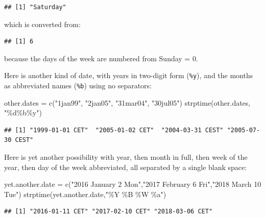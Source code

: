 \documentclass[
]{book}
\newenvironment{Shaded}{\begin{snugshade}}{\end{snugshade}}
\newcommand{\FunctionTok}[1]{\textcolor[rgb]{0.00,0.00,0.00}{#1}}
\newcommand{\NormalTok}[1]{#1}
\newcommand{\OtherTok}[1]{\textcolor[rgb]{0.56,0.35,0.01}{#1}}
\newcommand{\SpecialCharTok}[1]{\textcolor[rgb]{0.00,0.00,0.00}{#1}}
\newcommand{\StringTok}[1]{\textcolor[rgb]{0.31,0.60,0.02}{#1}}
\theoremstyle{definition}
\theoremstyle{definition}
\theoremstyle{definition}
\theoremstyle{definition}
\theoremstyle{remark}
\begin{document}
\begin{verbatim}
## [1] "Saturday"
\end{verbatim}

which is converted from:

\begin{Shaded}
\end{Shaded}

\begin{verbatim}
## [1] 6
\end{verbatim}

because the days of the week are numbered from Sunday = 0.

Here is another kind of date, with years in two-digit form (\texttt{\%y}), and the months as abbreviated names (\texttt{\%b}) using no separators:

\begin{Shaded}
\begin{Highlighting}[]
\NormalTok{other.dates }\OtherTok{=} \FunctionTok{c}\NormalTok{(}\StringTok{"1jan99"}\NormalTok{, }\StringTok{"2jan05"}\NormalTok{, }\StringTok{"31mar04"}\NormalTok{, }\StringTok{"30jul05"}\NormalTok{)}
\FunctionTok{strptime}\NormalTok{(other.dates, }\StringTok{"\%d\%b\%y"}\NormalTok{)}
\end{Highlighting}
\end{Shaded}

\begin{verbatim}
## [1] "1999-01-01 CET"  "2005-01-02 CET"  "2004-03-31 CEST" "2005-07-30 CEST"
\end{verbatim}

Here is yet another possibility with year, then month in full, then week of the year, then day of the week abbreviated, all separated by a single blank space:

\begin{Shaded}
\begin{Highlighting}[]
\NormalTok{yet.another.date }\OtherTok{=} \FunctionTok{c}\NormalTok{(}\StringTok{"2016 January 2 Mon"}\NormalTok{,}\StringTok{"2017 February 6 Fri"}\NormalTok{,}\StringTok{"2018 March 10 Tue"}\NormalTok{)}
\FunctionTok{strptime}\NormalTok{(yet.another.date,}\StringTok{"\%Y \%B \%W \%a"}\NormalTok{)}
\end{Highlighting}
\end{Shaded}

\begin{verbatim}
## [1] "2016-01-11 CET" "2017-02-10 CET" "2018-03-06 CET"
\end{verbatim}
\end{document}
